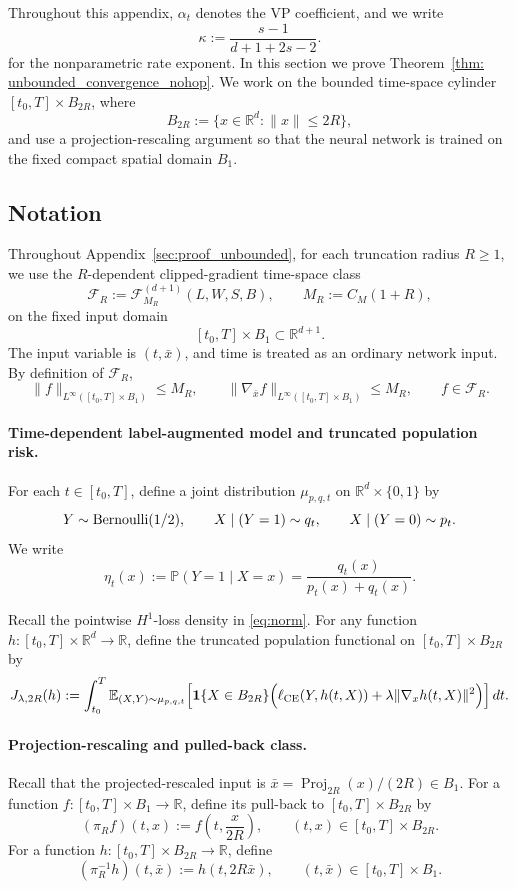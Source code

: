 \documentclass[11pt]{article}
\theoremstyle{plain}
\theoremstyle{definition}
\theoremstyle{remark}
\begin{document}
Throughout this appendix, \(\alpha_t\) denotes the VP coefficient, and we write
\[
\kappa:=\frac{s-1}{d+1+2s-2}.
\]
for the nonparametric rate exponent. In this section we prove Theorem~\ref{thm: unbounded_convergence_nohop}.
We work on the bounded time-space cylinder \([t_0,T]\times B_{2R}\), where
\[
B_{2R}:=\{x\in\mathbb R^d:\|x\|\le 2R\},
\]
and use a projection-rescaling argument so that the neural network is trained
on the fixed compact spatial domain \(B_1\).

\subsection{Notation}
Throughout Appendix~\ref{sec:proof_unbounded}, for each truncation radius \(R\ge1\), we use the
\(R\)-dependent clipped-gradient time-space class
\[
\mathcal F_R:=\mathcal F^{(d+1)}_{M_R}(L,W,S,B),
\qquad
M_R:=C_M(1+R),
\]
on the fixed input domain
\[
[t_0,T]\times B_1\subset\mathbb R^{d+1}.
\]
The input variable is \((t,\bar x)\), and time is treated as an ordinary
network input. By definition of \(\mathcal F_R\),
\[
\|f\|_{L^\infty([t_0,T]\times B_1)}\le M_R,
\qquad
\|\nabla_{\bar x}f\|_{L^\infty([t_0,T]\times B_1)}\le M_R,
\qquad f\in\mathcal F_R.
\]

\paragraph{Time-dependent label-augmented model and truncated population risk.}
For each \(t\in[t_0,T]\), define a joint distribution
\(\mu_{p,q,t}\) on \(\mathbb R^d\times\{0,1\}\) by
\begin{equation}
\label{eq:mu-pqt-def-unbounded}
Y\sim{\rm Bernoulli}(1/2),
\qquad
X\mid(Y=1)\sim q_t,
\qquad
X\mid(Y=0)\sim p_t.
\end{equation}
We write
\[
\eta_t(x):=\mathbb P(Y=1\mid X=x)
=
\frac{q_t(x)}{p_t(x)+q_t(x)}.
\]

Recall the pointwise \(H^1\)-loss density in \eqref{eq:norm}. For any
function \(h:[t_0,T]\times\mathbb R^d\to\mathbb R\), define the truncated
population functional on \([t_0,T]\times B_{2R}\) by
\begin{equation}
\label{eq:pop_trunc_J_2R_new}
J_{\lambda,2R}(h):=
\int_{t_0}^T
\mathbb E_{(X,Y)\sim\mu_{p,q,t}}
\Big[
\mathbf 1\{X\in B_{2R}\}
\Big(
\ell_{\rm CE}(Y,h(t,X))+\lambda\|\nabla_x h(t,X)\|^2
\Big)
\Big]\,dt.
\end{equation}

\paragraph{Projection-rescaling and pulled-back class.}
Recall that the projected-rescaled input is
\(\bar x=\operatorname{Proj}_{2R}(x)/(2R)\in B_1\).  For a function
\(f:[t_0,T]\times B_1\to\mathbb R\), define its pull-back to
\([t_0,T]\times B_{2R}\) by
\begin{equation}
\label{eq:pullback-operator}
(\pi_R f)(t,x):=
f\!\left(t,\frac{x}{2R}\right),
\qquad (t,x)\in [t_0,T]\times B_{2R}.
\end{equation}
For a function \(h:[t_0,T]\times B_{2R}\to\mathbb R\), define
\[
(\pi_R^{-1}h)(t,\bar x):=h(t,2R\bar x),
\qquad (t,\bar x)\in [t_0,T]\times B_1.
\]
\end{document}

